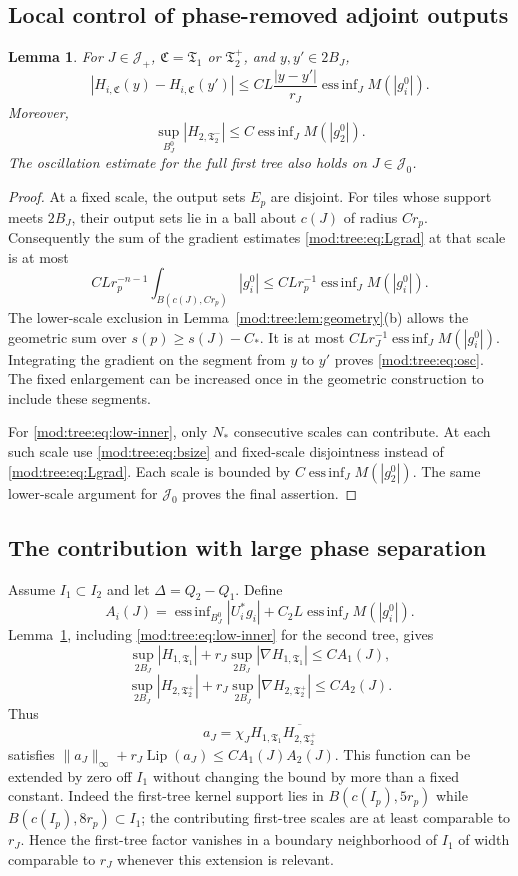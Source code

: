 \documentclass[11pt]{article}
\numberwithin{equation}{section}
\newtheorem{lemma}[theorem]{Lemma}
\theoremstyle{remark}
\theoremstyle{definition}
\newcommand{\norm}[1]{\lVert #1\rVert}
\newcommand{\TT}{\mathfrak T}
\newcommand{\cJ}{\mathcal J}
\DeclareMathOperator*{\essinf}{ess\,inf}
\begin{document}
\subsection{Local control of phase-removed adjoint outputs}
\begin{lemma}\label{mod:tree:lem:local-osc}
For $J\in\cJ_+$, $\mathfrak C=\TT_1$ or $\TT_2^+$, and $y,y'\in2B_J$,
\begin{equation}\label{mod:tree:eq:osc}
 |H_{i,\mathfrak C}(y)-H_{i,\mathfrak C}(y')|
 \le CL\frac{|y-y'|}{r_J}\essinf_JM(|g_i^0|).
\end{equation}
Moreover,
\begin{equation}\label{mod:tree:eq:low-inner}
 \sup_{B_J^0}|H_{2,\TT_2^-}|
 \le C\essinf_JM(|g_2^0|).
\end{equation}
The oscillation estimate for the full first tree also holds on $J\in\cJ_0$.
\end{lemma}
\begin{proof}
At a fixed scale, the output sets $E_p$ are disjoint. For tiles whose support meets $2B_J$, their output sets lie in a ball about $c(J)$ of radius $Cr_p$. Consequently the sum of the gradient estimates \eqref{mod:tree:eq:Lgrad} at that scale is at most
\[
 CLr_p^{-n-1}\int_{B(c(J),Cr_p)}|g_i^0|
 \le CLr_p^{-1}\essinf_JM(|g_i^0|).
\]
The lower-scale exclusion in Lemma~\ref{mod:tree:lem:geometry}(b) allows the geometric sum over $s(p)\ge s(J)-C_*$. It is at most $CLr_J^{-1}\essinf_JM(|g_i^0|)$. Integrating the gradient on the segment from $y$ to $y'$ proves \eqref{mod:tree:eq:osc}. The fixed enlargement can be increased once in the geometric construction to include these segments.

For \eqref{mod:tree:eq:low-inner}, only $N_*$ consecutive scales can contribute. At each such scale use \eqref{mod:tree:eq:bsize} and fixed-scale disjointness instead of \eqref{mod:tree:eq:Lgrad}. Each scale is bounded by $C\essinf_JM(|g_2^0|)$. The same lower-scale argument for $\cJ_0$ proves the final assertion.
\end{proof}

\subsection{The contribution with large phase separation}
Assume $I_1\subset I_2$ and let $\Delta=Q_2-Q_1$. Define
\[
 A_i(J)=\essinf_{B_J^0}|U_i^*g_i|+C_2L\essinf_JM(|g_i^0|).
\]
Lemma~\ref{mod:tree:lem:local-osc}, including \eqref{mod:tree:eq:low-inner} for the second tree, gives
\[
 \sup_{2B_J}|H_{1,\TT_1}|+r_J\sup_{2B_J}|\nabla H_{1,\TT_1}|\le CA_1(J),
\]
\[
 \sup_{2B_J}|H_{2,\TT_2^+}|+r_J\sup_{2B_J}|\nabla H_{2,\TT_2^+}|\le CA_2(J).
\]
Thus
\[
 a_J=\chi_JH_{1,\TT_1}\overline{H_{2,\TT_2^+}}
\]
satisfies $\norm{a_J}_\infty+r_J\operatorname{Lip}(a_J)\le CA_1(J)A_2(J)$. This function can be extended by zero off $I_1$ without changing the bound by more than a fixed constant. Indeed the first-tree kernel support lies in $B(c(I_p),5r_p)$ while $B(c(I_p),8r_p)\subset I_1$; the contributing first-tree scales are at least comparable to $r_J$. Hence the first-tree factor vanishes in a boundary neighborhood of $I_1$ of width comparable to $r_J$ whenever this extension is relevant.
\end{document}
